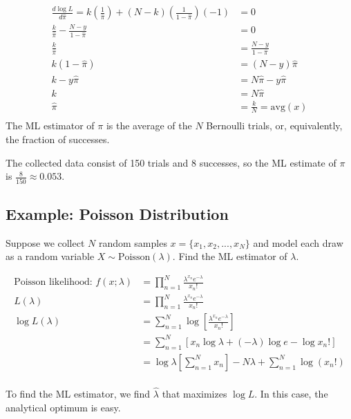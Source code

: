 \documentclass[
]{book}
\begin{document}
\[
\begin{aligned}
\frac{d \log L}{d\hat{\pi}} = k \left( \frac{1}{\hat{\pi}}\right) + (N - k) \left( \frac{1}{1 - \hat{\pi}}\right)(-1) &= 0\\
\frac{k}{\hat{\pi}} - \frac{N - y}{1 - \hat{\pi}} &= 0 \\
\frac{k}{\hat{\pi}} &= \frac{N - y}{1 - \hat{\pi}} \\
k(1 - \hat{\pi}) &= (N - y)\hat{\pi} \\
k - y\hat{\pi} &= N\hat{\pi} - y\hat{\pi} \\
k  &= N\hat{\pi} \\
\hat{\pi} &= \frac{k}{N} = \text{avg}(x)\\
\end{aligned}
\] The ML estimator of \(\pi\) is the average of the \(N\) Bernoulli
trials, or, equivalently, the fraction of successes.

The collected data consist of 150 trials and 8 successes, so the ML
estimate of \(\pi\) is \(\frac{8}{150} \approx 0.053\).

\hypertarget{example-poisson-distribution}{%
\subsection{Example: Poisson
Distribution}\label{example-poisson-distribution}}

Suppose we collect \(N\) random samples \(x = \{x_1, x_2, ..., x_N\}\)
and model each draw as a random variable
\(X \sim \text{Poisson}(\lambda)\). Find the ML estimator of
\(\lambda\).

\[
\begin{aligned}
\text{Poisson likelihood: } f(x; \lambda) &= \prod_{n = 1}^N \frac{\lambda^{x_n} e^{-\lambda}}{x_n!} \\
L(\lambda) &= \prod_{n = 1}^N \frac{\lambda^{x_n} e^{-\lambda}}{x_n!} \\
\log L(\lambda) &= \sum_{n = 1}^N \log \left[ \frac{\lambda^{x_n} e^{-\lambda}}{x_n!} \right]\\
&= \sum_{n = 1}^N \left[ x_n \log \lambda + (-\lambda) \log e - \log x_n! \right]\\
&= \log \lambda \left[ \sum_{n = 1}^N x_n \right]  -N\lambda + \sum_{n = 1}^N \log (x_n!) \\
\end{aligned}
\]

To find the ML estimator, we find \(\hat{\lambda}\) that maximizes
\(\log L\). In this case, the analytical optimum is easy.
\end{document}
